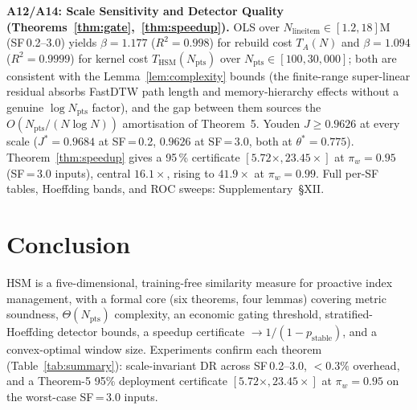 \documentclass[10pt,journal,compsoc]{IEEEtran}
\newcommand{\Npts}{N_{\mathrm{pts}}}
\newcommand{\thetastar}{\theta^{*}}
\begin{document}
\textbf{A12/A14: Scale Sensitivity and Detector Quality
(Theorems~\ref{thm:gate},~\ref{thm:speedup}).}
OLS over $N_{\mathrm{lineitem}}\!\in\![1.2,18]\mathrm{M}$ (SF\,0.2--3.0)
yields $\beta\!=\!1.177$ ($R^2\!=\!0.998$) for rebuild cost $T_A(N)$
and $\beta\!=\!1.094$ ($R^2\!=\!0.9999$) for kernel cost
$T_{\mathrm{HSM}}(\Npts)$ over $\Npts\!\in\![100,30{,}000]$; both are
consistent with the Lemma~\ref{lem:complexity} bounds (the finite-range
super-linear residual absorbs FastDTW path length and memory-hierarchy
effects without a genuine $\log\Npts$ factor), and the gap between
them sources the $O(\Npts/(N\log N))$ amortisation of Theorem~5.
Youden $J\!\ge\!0.9626$ at every scale ($J^{*}\!=\!0.9684$ at
SF\,=\,0.2, $0.9626$ at SF\,=\,3.0, both at $\thetastar\!=\!0.775$).
Theorem~\ref{thm:speedup} gives a 95\,\% certificate
$[5.72\times,23.45\times]$ at $\pi_w\!=\!0.95$ (SF\,=\,3.0 inputs),
central $16.1\times$, rising to $41.9\times$ at $\pi_w\!=\!0.99$.
Full per-SF tables, Hoeffding bands, and ROC sweeps: Supplementary~\S XII.

\section{Conclusion}

HSM is a five-dimensional, training-free similarity measure for
proactive index management, with a formal core (six theorems, four
lemmas) covering metric soundness, $\Theta(\Npts)$ complexity, an
economic gating threshold, stratified-Hoeffding detector bounds, a
speedup certificate $\to\!1/(1{-}p_{\mathrm{stable}})$, and a
convex-optimal window size.  Experiments confirm each theorem
(Table~\ref{tab:summary}): scale-invariant DR across SF\,0.2--3.0,
$<\!0.3\%$ overhead, and a Theorem-5 95\% deployment certificate
$[5.72\times, 23.45\times]$ at $\pi_w\!=\!0.95$ on the worst-case
SF\,=\,3.0 inputs.
\end{document}
